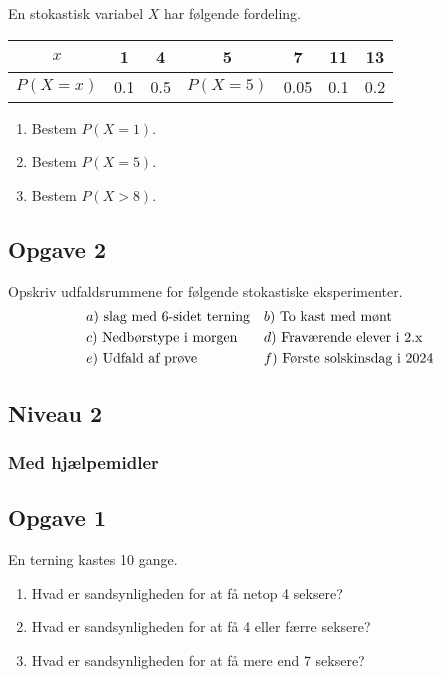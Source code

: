 \documentclass[12pt]{article}
\begin{document}
En stokastisk variabel $X$ har følgende fordeling.
\begin{table}[H]
	\centering
	\begin{tabular}{c|c|c|c|c|c|c}
		$x$ & 1 & 4 & 5 & 7 & 11 & 13 \\
		\hline
		$P(X = x)$ & 0.1 & 0.5 & $P(X = 5)$ & 0.05 & 0.1 & 0.2
	\end{tabular}
\end{table}

\begin{enumerate}[label=\roman*)]
	\item Bestem $P(X = 1)$.
	\item Bestem $P(X = 5)$.
	\item Bestem $P(X > 8)$.
\end{enumerate}

\subsection*{Opgave 2}

Opskriv udfaldsrummene for følgende stokastiske eksperimenter.
\begin{align*}
	&a) \ \textnormal{slag med 6-sidet terning}     &&b) \ \textnormal{To kast med mønt}     \\
	&c) \ \textnormal{Nedbørstype i morgen}   &&d) \ \textnormal{Fraværende elever i 2.x}     \\
	&e) \ \textnormal{Udfald af prøve}    &&f) \ \textnormal{Første solskinsdag i 2024}       \\
\end{align*}


\subsection*{Niveau 2}
\subsubsection*{Med hjælpemidler}

\subsection*{Opgave 1}
En terning kastes 10 gange.
\begin{enumerate}[label=\roman*)]
	\item Hvad er sandsynligheden for at få netop 4 seksere?
	\item Hvad er sandsynligheden for at få 4 eller færre seksere?
	\item Hvad er sandsynligheden for at få mere end 7 seksere?
\end{enumerate}
\end{document}
